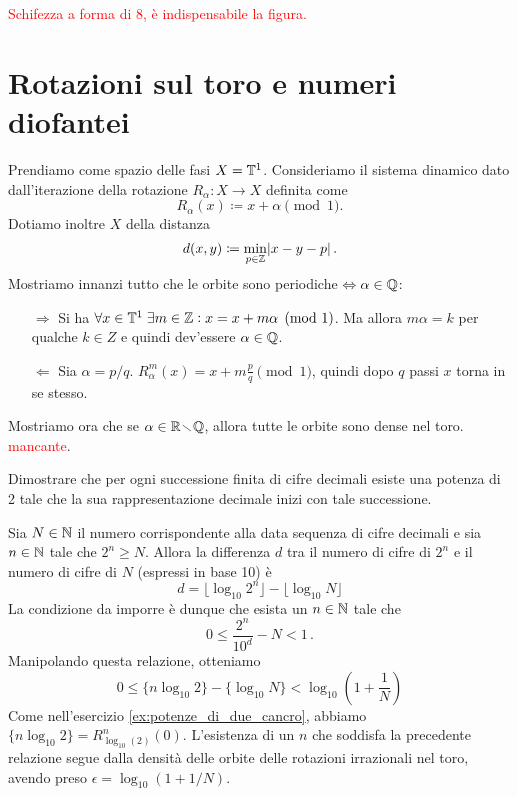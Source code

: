 \begin{example}
    \textcolor{red}{Schifezza a forma di 8, è indispensabile la figura.}
\end{example}

\section{Rotazioni sul toro e numeri diofantei}
Prendiamo come spazio delle fasi $ X = \mathbb{T}^1 $. Consideriamo il sistema dinamico dato dall'iterazione della rotazione $ R_\alpha\colon X\to X $ definita come
\[ R_\alpha(x) \coloneqq x + \alpha \pmod{1}. \]
Dotiamo inoltre $ X $ della distanza
\[ d(x,y) \coloneqq \min_{p\in\mathbb{Z}} \abs{x-y-p}. \]
Mostriamo innanzi tutto che le orbite sono periodiche $ \Leftrightarrow \alpha\in\mathbb{Q} $:
\begin{itemize}
    \item[$\Rightarrow$] Si ha $ \forall x\in\mathbb{T}^1\; \exists m\in\mathbb{Z} : x = x + m\alpha \pmod{1} $. Ma allora $ m\alpha = k $ per qualche $ k\in Z $ e quindi dev'essere $ \alpha\in\mathbb{Q} $.
    \item[$\Leftarrow$] Sia $ \alpha = p/q $. $ R_\alpha^m(x) = x + m\frac{p}{q} \pmod{1} $, quindi dopo $ q $ passi $ x $ torna in se stesso.
\end{itemize}
Mostriamo ora che se $ \alpha\in\mathbb{R}\!\smallsetminus\!\mathbb{Q} $, allora tutte le orbite sono dense nel toro.
\textcolor{red}{mancante}.

\begin{exercise}
    Dimostrare che per ogni successione finita di cifre decimali esiste una potenza di 2 tale che la sua rappresentazione decimale inizi con tale successione.
\end{exercise}
\begin{solution}
    Sia $ N\in\mathbb{N} $ il numero corrispondente alla data sequenza di cifre decimali e sia $ n\in\mathbb{N} $ tale che $ 2^n \geq N $. Allora la differenza $ d $ tra il numero di cifre di $ 2^n $ e il numero di cifre di $ N $ (espressi in base 10) è
    \[ d = \lfloor \log_{10}2^n\rfloor - \lfloor \log_{10}N \rfloor \]
    La condizione da imporre è dunque che esista un $ n\in\mathbb{N} $ tale che
    \[ 0 \leq \frac{2^n}{10^{d}} - N < 1 \, . \]
    Manipolando questa relazione, otteniamo
    \[ 0 \leq \{ n\log_{10}2 \} - \{ \log_{10}N \} < \log_{10}\left( 1 + \frac{1}{N} \right) \]
    Come nell'esercizio \ref{ex:potenze_di_due_cancro}, abbiamo $ \{ n\log_{10}2 \} = R^n_{\log_{10}(2)}(0) $. L'esistenza di un $ n $ che soddisfa la precedente relazione segue  dalla densità delle orbite delle rotazioni irrazionali nel toro, avendo preso $ \epsilon = \log_{10}\left( 1 + 1/N \right) $.
\end{solution}


